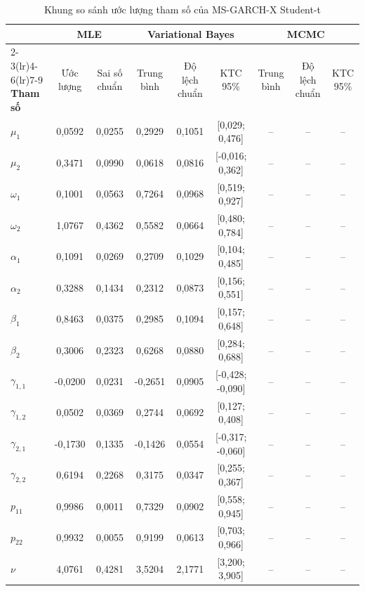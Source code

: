 \documentclass[12pt,a4paper]{article}
\numberwithin{equation}{section}
\begin{document}
\begin{landscape}
\begin{table}[H]
\centering
\caption{Khung so sánh ước lượng tham số của MS-GARCH-X Student-t}
\label{tab:parameter-template}
\begin{tabular}{lcccccccc}
\toprule
& \multicolumn{2}{c}{\textbf{MLE}} & \multicolumn{3}{c}{\textbf{Variational Bayes}} & \multicolumn{3}{c}{\textbf{MCMC}} \\
\cmidrule(lr){2-3}\cmidrule(lr){4-6}\cmidrule(lr){7-9}
\textbf{Tham số} & Ước lượng & Sai số chuẩn & Trung bình & Độ lệch chuẩn & KTC 95\% & Trung bình & Độ lệch chuẩn & KTC 95\% \\
\midrule
$\mu_1$ & 0{,}0592 & 0{,}0255 & 0{,}2929 & 0{,}1051 & [0{,}029; 0{,}476] & -- & -- & -- \\
$\mu_2$ & 0{,}3471 & 0{,}0990 & 0{,}0618 & 0{,}0816 & [-0{,}016; 0{,}362] & -- & -- & -- \\
$\omega_1$ & 0{,}1001 & 0{,}0563 & 0{,}7264 & 0{,}0968 & [0{,}519; 0{,}927] & -- & -- & -- \\
$\omega_2$ & 1{,}0767 & 0{,}4362 & 0{,}5582 & 0{,}0664 & [0{,}480; 0{,}784] & -- & -- & -- \\
$\alpha_1$ & 0{,}1091 & 0{,}0269 & 0{,}2709 & 0{,}1029 & [0{,}104; 0{,}485] & -- & -- & -- \\
$\alpha_2$ & 0{,}3288 & 0{,}1434 & 0{,}2312 & 0{,}0873 & [0{,}156; 0{,}551] & -- & -- & -- \\
$\beta_1$ & 0{,}8463 & 0{,}0375 & 0{,}2985 & 0{,}1094 & [0{,}157; 0{,}648] & -- & -- & -- \\
$\beta_2$ & 0{,}3006 & 0{,}2323 & 0{,}6268 & 0{,}0880 & [0{,}284; 0{,}688] & -- & -- & -- \\
$\gamma_{1,1}$ & -0{,}0200 & 0{,}0231 & -0{,}2651 & 0{,}0905 & [-0{,}428; -0{,}090] & -- & -- & -- \\
$\gamma_{1,2}$ & 0{,}0502 & 0{,}0369 & 0{,}2744 & 0{,}0692 & [0{,}127; 0{,}408] & -- & -- & -- \\
$\gamma_{2,1}$ & -0{,}1730 & 0{,}1335 & -0{,}1426 & 0{,}0554 & [-0{,}317; -0{,}060] & -- & -- & -- \\
$\gamma_{2,2}$ & 0{,}6194 & 0{,}2268 & 0{,}3175 & 0{,}0347 & [0{,}255; 0{,}367] & -- & -- & -- \\
$p_{11}$ & 0{,}9986 & 0{,}0011 & 0{,}7329 & 0{,}0902 & [0{,}558; 0{,}945] & -- & -- & -- \\
$p_{22}$ & 0{,}9932 & 0{,}0055 & 0{,}9199 & 0{,}0613 & [0{,}703; 0{,}966] & -- & -- & -- \\
$\nu$ & 4{,}0761 & 0{,}4281 & 3{,}5204 & 2{,}1771 & [3{,}200; 3{,}905] & -- & -- & -- \\
\bottomrule
\end{tabular}
\end{table}
\end{landscape}
\end{document}
